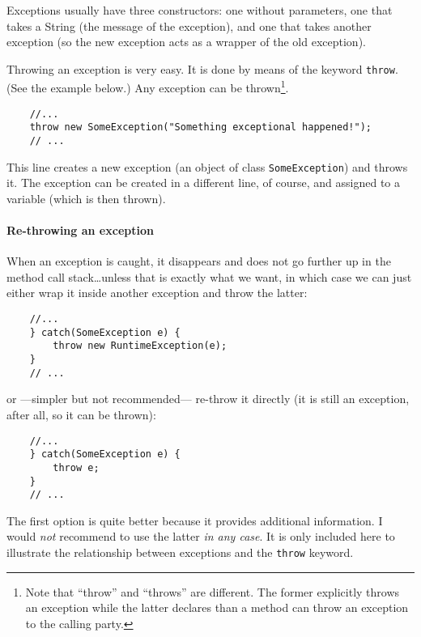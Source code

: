 Exceptions usually have three constructors: one without parameters,
one that takes a String (the message of the exception), and one that
takes another exception (so the new exception acts as a wrapper of the
old exception). 

Throwing an exception is very easy. It is done by means of the
keyword \verb+throw+. 
(See the example below.)
Any exception can be thrown\footnote{Note that ``throw'' and
  ``throws'' are different. The former explicitly throws an exception
  while the latter declares than a method can throw an exception to
  the calling party.}. 

\begin{verbatim}
    //...
    throw new SomeException("Something exceptional happened!");
    // ...
\end{verbatim}

This line creates a new exception (an object of class
\verb+SomeException+) and throws it. The exception can be created
in a different line, of course, and assigned to a variable (which is
then thrown). 



\paragraph{Re-throwing an exception}
\label{sec:re-throwing-an}

When an exception is caught, it disappears and does not go further up
in the method call stack\ldots unless that is exactly what we want, in which case
we can just either wrap it inside another exception and throw the
latter: 

\begin{verbatim}
    //...
    } catch(SomeException e) {
        throw new RuntimeException(e);
    }
    // ...
\end{verbatim}

or ---simpler but not recommended--- re-throw it directly (it is still an exception,
after all, so it can be thrown): 

\begin{verbatim}
    //...
    } catch(SomeException e) {
        throw e;
    }
    // ...
\end{verbatim}

The first option is quite better because it provides additional
information. I would \emph{not} recommend to use the latter \emph{in any
  case}. It is only included here to illustrate the
relationship between exceptions and the \verb+throw+ keyword.

